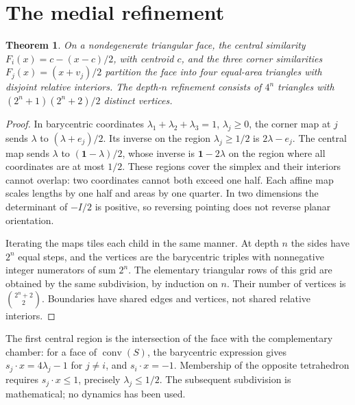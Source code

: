 \documentclass[10pt,a4paper,twocolumn]{article}
\newtheorem{theorem}{Theorem}
\newcommand{\conv}{\operatorname{conv}}
\begin{document}
\section*{The medial refinement}
\begin{theorem}
On a nondegenerate triangular face, the central similarity $F_i(x)=c-(x-c)/2$, with centroid $c$, and the three corner similarities $F_j(x)=(x+v_j)/2$ partition the face into four equal-area triangles with disjoint relative interiors. The depth-$n$ refinement consists of $4^n$ triangles with $(2^n+1)(2^n+2)/2$ distinct vertices.
\end{theorem}
\begin{proof}
In barycentric coordinates $\lambda_1+\lambda_2+\lambda_3=1$, $\lambda_j\ge0$, the corner map at $j$ sends $\lambda$ to $(\lambda+e_j)/2$. Its inverse on the region $\lambda_j\ge1/2$ is $2\lambda-e_j$. The central map sends $\lambda$ to $(\mathbf1-\lambda)/2$, whose inverse is $\mathbf1-2\lambda$ on the region where all coordinates are at most $1/2$. These regions cover the simplex and their interiors cannot overlap: two coordinates cannot both exceed one half. Each affine map scales lengths by one half and areas by one quarter. In two dimensions the determinant of $-I/2$ is positive, so reversing pointing does not reverse planar orientation.

Iterating the maps tiles each child in the same manner. At depth $n$ the sides have $2^n$ equal steps, and the vertices are the barycentric triples with nonnegative integer numerators of sum $2^n$. The elementary triangular rows of this grid are obtained by the same subdivision, by induction on $n$. Their number of vertices is $\binom{2^n+2}{2}$. Boundaries have shared edges and vertices, not shared relative interiors.
\end{proof}
The first central region is the intersection of the face with the complementary chamber: for a face of $\conv(S)$, the barycentric expression gives $s_j\cdot x=4\lambda_j-1$ for $j\ne i$, and $s_i\cdot x=-1$. Membership of the opposite tetrahedron requires $s_j\cdot x\le1$, precisely $\lambda_j\le1/2$. The subsequent subdivision is mathematical; no dynamics has been used.
\end{document}
